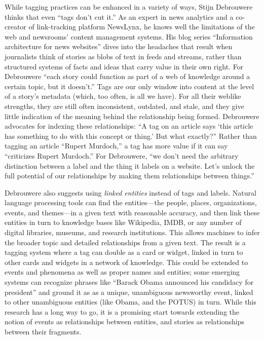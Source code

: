 While tagging practices can be enhanced in a variety of ways, Stijn Debrouwere thinks that even ``tags don't cut it.''\autocite[``Tags don't cut it'']{debrouwere_information_2010} As an expert in news analytics and a co-creator of link-tracking platform NewsLynx, he knows well the limitations of the web and newsrooms' content management systems. His blog series ``Information architecture for news websites'' dives into the headaches that result when journalists think of stories as blobs of text in feeds and streams, rather than structured systems of facts and ideas that carry value in their own right. For Debrouwere ``each story could function as part of a web of knowledge around a certain topic, but it doesn't.'' Tags are our only window into content at the level of a story's metadata (which, too often, is all we have). For all their weblike strengths, they are still often inconsistent, outdated, and stale, and they give little indication of the meaning behind the relationship being formed. Debrouwere advocates for indexing these relationships: ``A tag on an article says `this article has something to do with this concept or thing.' But what exactly?'' Rather than tagging an article ``Rupert Murdoch,'' a tag has more value if it can say ``criticizes Rupert Murdoch.'' For Debrouwere, ``we don't need the arbitrary distinction between a label and the thing it labels on a website. Let's unlock the full potential of our relationships by making them relationships between things.''

Debrouwere also suggests using \emph{linked entities} instead of tags and labels. Natural language processing tools can find the entities---the people, places, organizations, events, and themes---in a given text with reasonable accuracy, and then link these entities in turn to knowledge bases like Wikipedia, IMDB, or any number of digital libraries, museums, and research institutions. This allows machines to infer the broader topic and detailed relationships from a given text. The result is a tagging system where a tag can double as a card or widget, linked in turn to other cards and widgets in a network of knowledge. This could be extended to events and phenomena as well as proper names and entities; some emerging systems can recognize phrases like ``Barack Obama announced his candidacy for president'' and ground it as as a unique, unambiguous newsworthy event, linked to other unambiguous entities (like Obama, and the POTUS) in turn.\autocite{nothman_grounding_2013} While this research has a long way to go, it is a promising start towards extending the notion of events as relationships between entities, and stories as relationships between their fragments.

